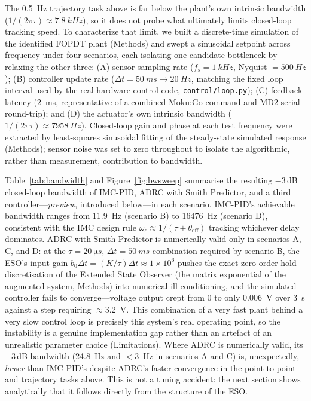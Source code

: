 \documentclass[fleqn,10pt]{wlscirep}
\begin{document}
The \SI{0.5}{Hz} trajectory task above is far below the plant's own intrinsic bandwidth ($1/(2\pi\tau) \approx \SI{7.8}{kHz}$), so it does not probe what ultimately limits closed-loop tracking speed. To characterize that limit, we built a discrete-time simulation of the identified FOPDT plant (Methods) and swept a sinusoidal setpoint across frequency under four scenarios, each isolating one candidate bottleneck by relaxing the other three: (A) sensor sampling rate ($f_s = \SI{1}{kHz}$, Nyquist $= \SI{500}{Hz}$); (B) controller update rate ($\Delta t = \SI{50}{ms} \rightarrow \SI{20}{Hz}$, matching the fixed loop interval used by the real hardware control code, \texttt{control/loop.py}); (C) feedback latency (\SI{2}{ms}, representative of a combined Moku:Go command and \textmu MD2 serial round-trip); and (D) the actuator's own intrinsic bandwidth ($1/(2\pi\tau) \approx \SI{7958}{Hz}$). Closed-loop gain and phase at each test frequency were extracted by least-squares sinusoidal fitting of the steady-state simulated response (Methods); sensor noise was set to zero throughout to isolate the algorithmic, rather than measurement, contribution to bandwidth.

Table~\ref{tab:bandwidth} and Figure~\ref{fig:bwsweep} summarise the resulting $-3$\,dB closed-loop bandwidth of IMC-PID, ADRC with Smith Predictor, and a third controller---\emph{preview}, introduced below---in each scenario. IMC-PID's achievable bandwidth ranges from \SI{11.9}{Hz} (scenario B) to \SI{16476}{Hz} (scenario D), consistent with the IMC design rule $\omega_c \approx 1/(\tau + \theta_\text{eff})$ tracking whichever delay dominates. ADRC with Smith Predictor is numerically valid only in scenarios A, C, and D: at the $\tau = \SI{20}{\micro s}$, $\Delta t = \SI{50}{ms}$ combination required by scenario B, the ESO's input gain $b_0 \Delta t = (K/\tau)\Delta t \approx 1\times10^{6}$ pushes the exact zero-order-hold discretisation of the Extended State Observer (the matrix exponential of the augmented system, Methods) into numerical ill-conditioning, and the simulated controller fails to converge---voltage output crept from 0 to only \SI{0.006}{V} over \SI{3}{s} against a step requiring $\approx$\SI{3.2}{V}. This combination of a very fast plant behind a very slow control loop is precisely this system's real operating point, so the instability is a genuine implementation gap rather than an artefact of an unrealistic parameter choice (Limitations). Where ADRC is numerically valid, its $-3$\,dB bandwidth (\SI{24.8}{Hz} and $<$\SI{3}{Hz} in scenarios A and C) is, unexpectedly, \emph{lower} than IMC-PID's despite ADRC's faster convergence in the point-to-point and trajectory tasks above. This is not a tuning accident: the next section shows analytically that it follows directly from the structure of the ESO.
\end{document}
